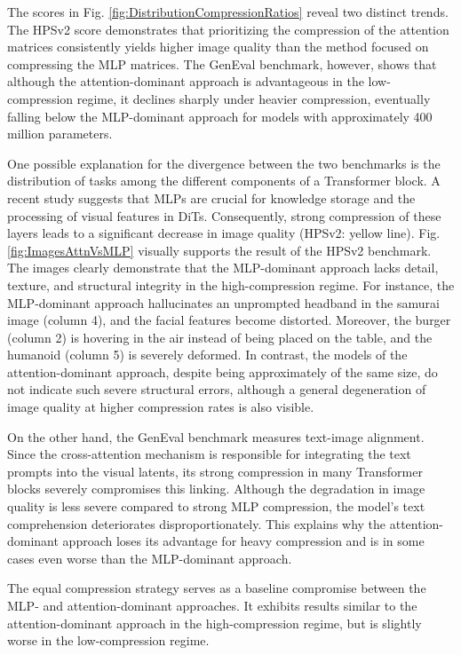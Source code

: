 The scores in Fig. \ref{fig:DistributionCompressionRatios} reveal two distinct trends. The HPSv2 score demonstrates that prioritizing the compression of the attention matrices consistently yields higher image quality than the method focused on compressing the \gls{MLP} matrices. The GenEval benchmark, however, shows that although the attention-dominant approach is advantageous in the low-compression regime, it declines sharply under heavier compression, eventually falling below the \gls{MLP}-dominant approach for models with approximately 400 million parameters. 

 One possible explanation for the divergence between the two benchmarks is the distribution of tasks among the different components of a Transformer block. A recent study \cite{dong2025attention} suggests that \gls{MLP}s are crucial for knowledge storage and the processing of visual features in \gls{DiT}s. Consequently, strong compression of these layers leads to a significant decrease in image quality (HPSv2: yellow line).
  Fig. \ref{fig:ImagesAttnVsMLP} visually supports the result of the HPSv2 benchmark. The images clearly demonstrate that the \gls{MLP}-dominant approach lacks detail, texture, and structural integrity in the high-compression regime. For instance, the \gls{MLP}-dominant approach hallucinates an unprompted headband in the samurai image (column 4), and the facial features become distorted. Moreover,  the burger (column 2) is hovering in the air instead of being placed on the table, and the humanoid (column 5) is severely deformed. In contrast, the models of the attention-dominant approach, despite being approximately of the same size, do not indicate such severe structural errors, although a general degeneration of image quality at higher compression rates is also visible. 
  
  
 On the other hand, the GenEval benchmark measures text-image alignment. Since the cross-attention mechanism is responsible for integrating the text prompts into the visual latents, its strong compression in many Transformer blocks severely compromises this linking. Although the degradation in image quality is less severe compared to strong \gls{MLP} compression, the model's text comprehension deteriorates disproportionately. This explains why the attention-dominant approach loses its advantage for heavy compression and is in some cases even worse than the \gls{MLP}-dominant approach. 
 
 The equal compression strategy serves as a baseline compromise between the \gls{MLP}- and attention-dominant approaches. It exhibits results similar to the attention-dominant approach in the high-compression regime, but is slightly worse in the low-compression regime. 
 

